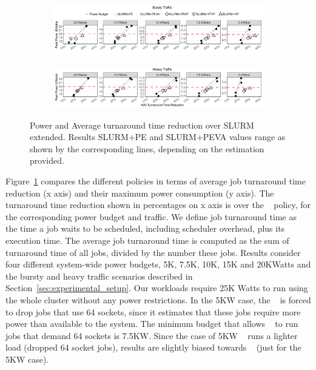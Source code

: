 \begin{figure}[ht]
	\centering
  \begin{subfigure}[b]{\textwidth}
    \includegraphics[width=\textwidth]{power_aware_job_scheduling/figures/peakPower2avgTurnaroundTime_bursty}
  \end{subfigure}%
	\qquad
 	\vspace{-.5cm} 
	\begin{subfigure}[b]{\textwidth}
    \includegraphics[width=\textwidth]{power_aware_job_scheduling/figures/peakPower2avgTurnaroundTime_heavy}
  \end{subfigure}%
 	\vspace{.3cm} 
	\caption{Power and Average turnaround time reduction over SLURM extended.  Results 
					SLURM+PE and SLURM+PEVA values range as shown by the corresponding lines, 
					depending on the estimation provided.}
	\label{fig:avg_turnaround_time}
\end{figure}



\par
Figure~\ref{fig:avg_turnaround_time} compares the different policies in terms of average
job turnaround time reduction (x axis) and their maximum power consumption (y axis).  The
turnaround time reduction shown in percentages on x axis is over the \DefaultSched~
policy, for the corresponding power budget and traffic.  We define job turnaround time as
the time a job waits to be scheduled, including scheduler overhead, plus its execution
time.  The average job turnaround time is computed as the sum of turnaround time of all
jobs, divided by the number these jobs.  Results consider four different system-wide power
budgets, 5K, 7.5K, 10K, 15K and 20KWatts and the bursty and heavy traffic scenarios
described in Section~\ref{sec:experimental_setup}.  Our workloads require 25K Watts to run
using the whole cluster without any power restrictions.  In the 5KW case, the
\DefaultSched~ is forced to drop jobs that use 64 sockets, since it estimates that these
jobs require more power than available to the system.  The minimum budget that allows
\DefaultSched~ to run jobs that demand 64 sockets is 7.5KW.  Since the case of 5KW
\DefaultSched~ runs a lighter load (dropped 64 socket jobs), results are slightly biased
towards \DefaultSched~ (just for the 5KW case).


